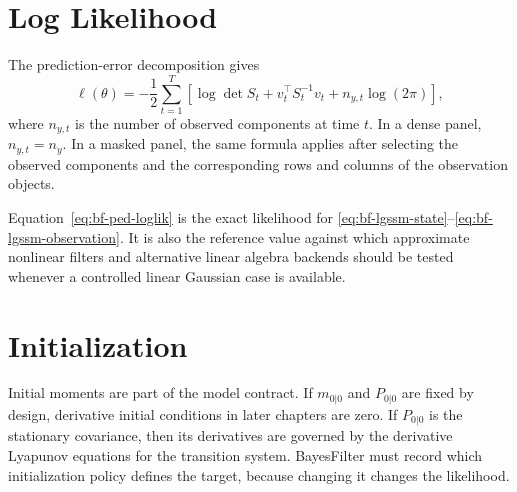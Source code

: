 \section{Log Likelihood}
\label{sec:bf-ped-loglik}

The prediction-error decomposition gives
\begin{equation}
\label{eq:bf-ped-loglik}
  \ell(\theta)
  =
  -\frac{1}{2}\sum_{t=1}^T
  \left[
    \log\det S_t
    + v_t^\top S_t^{-1}v_t
    + n_{y,t}\log(2\pi)
  \right],
\end{equation}
where $n_{y,t}$ is the number of observed components at time $t$.  In a dense
panel, $n_{y,t}=n_y$.  In a masked panel, the same formula applies after
selecting the observed components and the corresponding rows and columns of the
observation objects.

Equation~\eqref{eq:bf-ped-loglik} is the exact likelihood for
\eqref{eq:bf-lgssm-state}--\eqref{eq:bf-lgssm-observation}.  It is also the
reference value against which approximate nonlinear filters and alternative
linear algebra backends should be tested whenever a controlled linear Gaussian
case is available.

\section{Initialization}
\label{sec:bf-kalman-initialization}

Initial moments are part of the model contract.  If $m_{0|0}$ and $P_{0|0}$ are
fixed by design, derivative initial conditions in later chapters are zero.  If
$P_{0|0}$ is the stationary covariance, then its derivatives are governed by
the derivative Lyapunov equations for the transition system.  BayesFilter must
record which initialization policy defines the target, because changing it
changes the likelihood.
